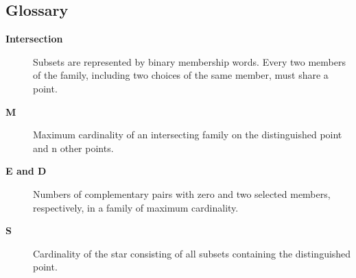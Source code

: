 \documentclass{article}
\theoremstyle{paperresult}
\begin{document}
\subsection*{Glossary}
\begin{description}
\item[{\normalfont\bfseries Intersection}] Subsets are represented by binary membership words. Every two members of the family, including two choices of the same member, must share a point.
\item[{\normalfont\bfseries M}] Maximum cardinality of an intersecting family on the distinguished point and n other points.
\item[{\normalfont\bfseries E and D}] Numbers of complementary pairs with zero and two selected members, respectively, in a family of maximum cardinality.
\item[{\normalfont\bfseries S}] Cardinality of the star consisting of all subsets containing the distinguished point.
\end{description}
\end{document}
